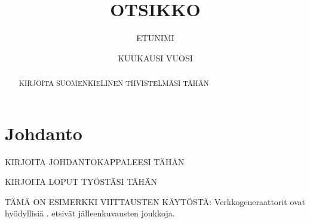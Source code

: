 \documentclass[mscthesis,finnish,oneside,biblatex]{uefcsthesis}
\title{OTSIKKO} %
\author{ETUNIMI}{SUKUNIMI} %
\date{KUUKAUSI VUOSI} %
\begin{document}
\maketitle
\begin{abstract}
  KIRJOITA SUOMENKIELINEN TIIVISTELMÄSI TÄHÄN
\end{abstract}

\frontmatter
\tableofcontents
\mainmatter

\chapter{Johdanto}
\label{cha:johdanto}

KIRJOITA JOHDANTOKAPPALEESI TÄHÄN

KIRJOITA LOPUT TYÖSTÄSI TÄHÄN

TÄMÄ ON ESIMERKKI VIITTAUSTEN KÄYTÖSTÄ:
Verkkogeneraattorit ovat hyödyllisiä \citep{metzler18random}.
\citet{kalofolias18from} etsivät jälleenkuvausten joukkoja.

\printbibliography[heading=bibintoc]

\backmatter %
\end{document}
